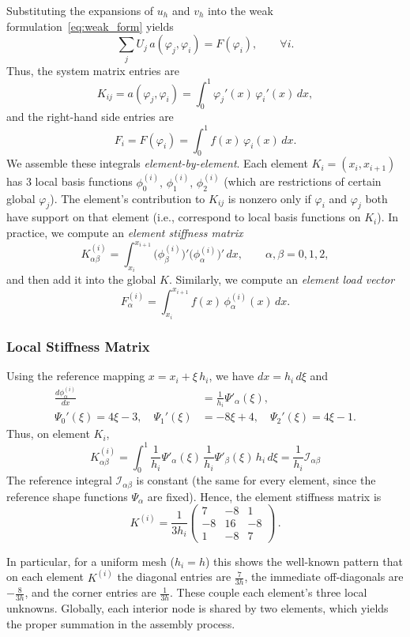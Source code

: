 \documentclass[a4paper,10pt]{article}
\begin{document}
Substituting the expansions of \(u_h\) and \(v_h\) into the weak formulation~\eqref{eq:weak_form} yields
\[
	\sum_{j} U_j\,a(\varphi_j,\varphi_i) = F(\varphi_i), \qquad \forall i.
\]
Thus, the system matrix entries are
\[
	K_{ij} = a(\varphi_j,\varphi_i) = \int_{0}^{1} \varphi_j'(x)\,\varphi_i'(x)\,dx,
\]
and the right-hand side entries are
\[
	F_i = F(\varphi_i) = \int_{0}^{1} f(x)\,\varphi_i(x)\,dx.
\]
We assemble these integrals \emph{element-by-element}. Each element \(K_i=(x_i,x_{i+1})\) has 3 local basis functions \(\phi_0^{(i)},\,\phi_1^{(i)},\,\phi_2^{(i)}\) (which are restrictions of certain global \(\varphi_j\)). The element’s contribution to \(K_{ij}\) is nonzero only if \(\varphi_i\) and \(\varphi_j\) both have support on that element (i.e., correspond to local basis functions on \(K_i\)). In practice, we compute an \emph{element stiffness matrix}
\[
	K^{(i)}_{\alpha\beta}= \int_{x_i}^{x_{i+1}} \bigl(\phi_{\beta}^{(i)}\bigr)' \bigl(\phi_{\alpha}^{(i)}\bigr)'\,dx,\qquad \alpha,\beta=0,1,2,
\]
and then add it into the global \(K\). Similarly, we compute an \emph{element load vector}
\[
	F^{(i)}_\alpha = \int_{x_i}^{x_{i+1}} f(x)\,\phi_{\alpha}^{(i)}(x)\,dx.
\]

\subsubsection{Local Stiffness Matrix}

Using the reference mapping \(x = x_i + \xi\,h_i\), we have \(dx = h_i\,d\xi\) and
\begin{align*}
	\frac{d\phi_{\alpha}^{(i)}}{dx}        & = \frac{1}{h_i}\Psi'_\alpha(\xi),   \\
	\Psi_0'(\xi)=4\xi-3,\quad \Psi_1'(\xi) & =-8\xi+4,\quad \Psi_2'(\xi)=4\xi-1.
\end{align*}
Thus, on element \(K_i\),
\[
	K^{(i)}_{\alpha\beta} = \int_{0}^{1} \frac{1}{h_i}\Psi'_\alpha(\xi)\,\frac{1}{h_i}\Psi'_\beta(\xi)\,h_i\,d\xi
	= \frac{1}{h_i} \mathcal{I}_{\alpha\beta}
\]
The reference integral \(\mathcal{I}_{\alpha\beta}\) is constant (the same for every element, since the reference shape functions \(\Psi_\alpha\) are fixed).
Hence, the element stiffness matrix is
\[
	K^{(i)} = \frac{1}{3h_i}
	\begin{pmatrix}
		7  & -8 & 1  \\
		-8 & 16 & -8 \\
		1  & -8 & 7
	\end{pmatrix}\,.
\]

In particular, for a uniform mesh (\(h_i=h\)) this shows the well-known pattern that on each element \(K^{(i)}\) the diagonal entries are \(\frac{7}{3h}\), the immediate off-diagonals are \(-\frac{8}{3h}\), and the corner entries are \(\frac{1}{3h}\). These couple each element's three local unknowns. Globally, each interior node is shared by two elements, which yields the proper summation in the assembly process.
\end{document}
